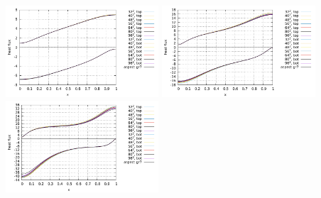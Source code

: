 \includegraphics[width=5.7cm]{python_codes/fieldstone_110/results_EBA/heatflux_Ra1e4.pdf}
\includegraphics[width=5.7cm]{python_codes/fieldstone_110/results_EBA/heatflux_Ra1e5.pdf}
\includegraphics[width=5.7cm]{python_codes/fieldstone_110/results_EBA/heatflux_Ra1e6.pdf}


